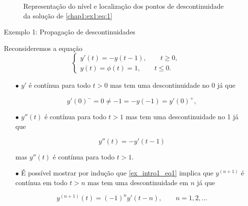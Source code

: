 \documentclass{beamer}
\theoremstyle{plain}
\theoremstyle{definition}
\begin{document}
\begin{frame}
\begin{figure}[H]
\begin{center}
\begin{adjustbox}{max width=\textwidth}
                 \end{adjustbox}
             \end{center}
             \caption{Representação do nível e localização dos pontos de descontinuidade da solução de  \eqref{chap1:ex1:eq:1}}
             \label{chap1:ex1:fig:1}
         \end{figure}



     
\end{frame}



\begin{frame}{Exemplo 1: Propagação de descontinuidades}

    \scriptsize
        Reconsideremos a equação
        \begin{equation}
            \begin{cases}
                y'(t) = -y(t - 1), \qquad t \geq 0, \\
                y(t) = \phi(t) = 1, \qquad t \leq 0.
            \end{cases} 
        \end{equation}


        \begin{itemize}
            \item[$\bullet$] $y'$ é contínua para todo $t > 0$ mas tem uma descontinuidade no 0 já que

                \[
                    y'(0)^- = 0 \neq -1 = -y(-1) = y'(0)^+,
                \]
    


            \item[$\bullet$] $y''(t)$ é contínua para todo $t>1$ mas tem uma descontinuidade no 1 já que 

                \begin{equation}
                    y''(t) = - y'(t - 1)
                    \label{ex_intro1_eq1}
                \end{equation}

                mas $y''(t)$ é contínua para todo $t > 1$.


            \item[$\bullet$] É possível mostrar por indução que \eqref{ex_intro1_eq1} implica que $y^{(n+1)}$ é contínua em todo $t>n$ mas tem uma descontinuidade em $n$ já que

                \[
                    y^{(n+1)}(t) = (-1)^n y'(t - n), \qquad n = 1,2, ...
                \]


        \end{itemize}

\end{frame}
\end{document}
